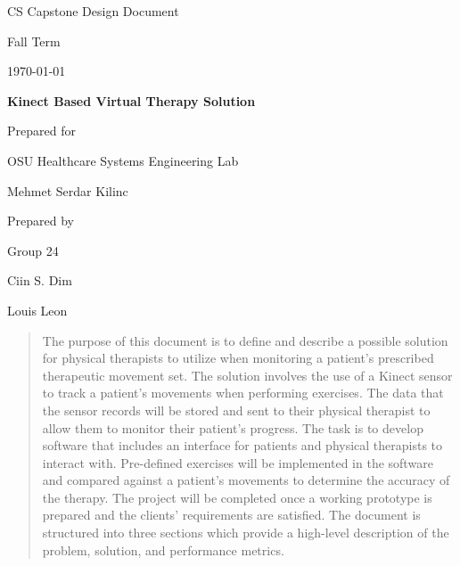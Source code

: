 \documentclass[onecolumn, draftclsnofoot,10pt, compsoc]{IEEEtran}
\def \CapstoneTeamName{     TeamName}
\def \CapstoneTeamNumber{       24}
\def \GroupMemberOne{            Ciin S. Dim}
\def \GroupMemberTwo{           Louis Leon}
\def \CapstoneProjectName{      Kinect Based Virtual Therapy Solution}
\def \CapstoneSponsorCompany{   OSU Healthcare Systems Engineering Lab}
\def \CapstoneSponsorPerson{        Mehmet Serdar Kilinc}
\def \DocType{      %
                Design Document
                }
\newcommand{\NameSigPair}[1]{\par
\makebox[2.75in][r]{#1} \hfil   \makebox[3.25in]{\makebox[2.25in]{\hrulefill} \hfill        \makebox[.75in]{\hrulefill}}
\par\vspace{-12pt} \textit{\tiny\noindent
\makebox[2.75in]{} \hfil        \makebox[3.25in]{\makebox[2.25in][r]{Signature} \hfill  \makebox[.75in][r]{Date}}}}
\renewcommand{\NameSigPair}[1]{#1}
\begin{document}
\begin{titlepage}
    \begin{singlespace}
        \hfill 
        \par\vspace{.2in}
        \centering
        \scshape{
            \huge CS Capstone\DocType \par
            {\large Fall Term}\par
            {\large\today}\par
            \vspace{.5in}
            \textbf{\Huge\CapstoneProjectName}\par
            \vfill
            {\large Prepared for}\par
            \Huge \CapstoneSponsorCompany\par
            \vspace{5pt}
            {\Large\NameSigPair{\CapstoneSponsorPerson}\par}
            {\large Prepared by }\par
            Group\CapstoneTeamNumber\par
            \vspace{5pt}
            {\Large
                \NameSigPair{\GroupMemberOne}\par
                \NameSigPair{\GroupMemberTwo}\par
            }
            \vspace{20pt}
        }
        \begin{abstract}
            The purpose of this document is to define and describe a possible solution for physical therapists to utilize when monitoring a patient's prescribed therapeutic movement set. The solution involves the use of a Kinect sensor to track a patient's movements when performing exercises. The data that the sensor records will be stored and sent to their physical therapist to allow them to monitor their patient's progress. The task is to develop software that includes an interface for patients and physical therapists to interact with. Pre-defined exercises will be implemented in the software and compared against a patient's movements to determine the accuracy of the therapy. The project will be completed once a working prototype is prepared and the clients' requirements are satisfied. The document is structured into three sections which provide a high-level description of the problem, solution, and performance 
metrics.
        \end{abstract}     
    \end{singlespace}
\end{titlepage}
\newpage
{}
\tableofcontents
\clearpage
\end{document}
